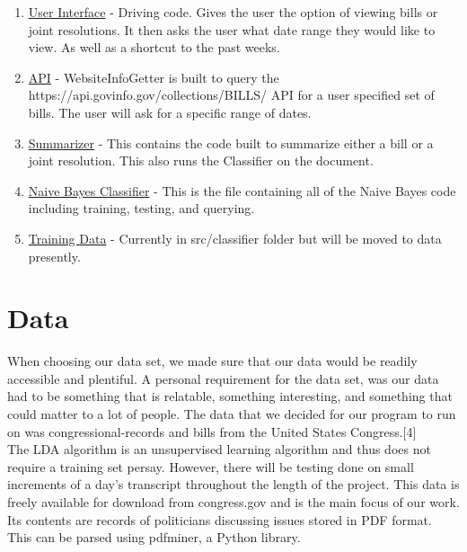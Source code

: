 \documentclass[11pt,a4paper]{article}
\begin{document}
\begin{enumerate}
    \item \href{https://gitlab.com/Merchant89/b/-/blob/master/src/Classifer/UserInterface.py}{User Interface} - Driving code. Gives the user the option of viewing bills or joint resolutions. It then asks the user what date range they would like to view. As well as a shortcut to the past weeks.
    \item \href{https://gitlab.com/Merchant89/b/-/blob/master/src/Classifer/WebsiteInfoGetter.py}{API} - WebsiteInfoGetter is built to query the https://api.govinfo.gov/collections/BILLS/ API for a user specified set of bills. The user will ask for a specific range of dates. 
    \item \href{https://gitlab.com/Merchant89/b/-/blob/master/src/Classifer/ResolutionSummarizer.py}{Summarizer} - This contains the code built to summarize either a bill or a joint resolution. This also runs the Classifier on the document. 
    \item \href{https://gitlab.com/Merchant89/b/-/blob/master/src/Classifer/NaiveClassifier.py}{Naive Bayes Classifier} - This is the file containing all of the Naive Bayes code including training, testing, and querying.
    \item \href{https://gitlab.com/Merchant89/b/-/tree/master/src/Classifer/train}{Training Data} - Currently in src/classifier folder but will be moved to data presently.
    
\end{enumerate}
\section{Data}

When choosing our data set, we made sure that our data would be readily accessible and plentiful. A personal requirement for the data set, was our data had to be something that is relatable, something interesting, and something that could matter to a lot of people. The data that we decided for our program to run on was congressional-records and bills from the United States Congress.[4] \\
\indent The LDA algorithm is an unsupervised learning algorithm and thus does not require a training set persay. However, there will be testing done on small increments of a day's transcript throughout the length of the project. This data is freely available for download from congress.gov and is the main focus of our work. Its contents are records of politicians discussing issues stored in PDF format. This can be parsed using pdfminer, a Python library.
\end{document}
